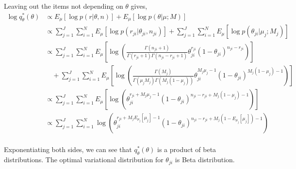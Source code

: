 \documentclass[11pt,reqno]{amsart}
\begin{document}
Leaving out the items not depending on $\theta$ gives,
\begin{equation}
\begin{split}
\log q_\theta^*(\theta) &\propto E_\mu \left[ \log p\left(r | \theta, n \right)\right] + E_\mu \left[ \log p\left(\theta | \mu; M \right)\right] \\
&\propto \sum_{j=1}^{J} \sum_{i=1}^{N} E_\mu  \left[ \log p \left( r_{ji} | \theta_{ji}, n_{ji} \right) \right] + \sum_{j=1}^{J} \sum_{i=1}^{N} E_\mu \left[ \log p\left(\theta_{ji} | \mu_j; M_j \right)\right] \\
&\propto \sum_{j=1}^{J} \sum_{i=1}^{N}  E_\mu  \left[ \log \left( \frac{ \Gamma(n_{ji}+1) } { \Gamma(r_{ji}+1) \Gamma( n_{ji} - r_{ji} + 1 ) } \theta_{ji}^{r_{ji}} (1 - \theta_{ji})^{n_{ji} - r_{ji}} \right) \right] \\
&\quad + \sum_{j=1}^{J} \sum_{i=1}^{N}  E_\mu  \left[ \log \left( \frac{ \Gamma(M_j) } { \Gamma(\mu_j M_j) \Gamma(M_j (1-\mu_j)) } \theta_{ji}^{M_j\mu_j -1} (1 - \theta_{ji})^{M_j ( 1 - \mu_j) - 1} \right) \right] \\
&\propto \sum_{j=1}^{J} \sum_{i=1}^{N} E_\mu\left[ \log \left( \theta_{ji}^{r_{ji} + M_j\mu_j -1} (1 - \theta_{ji})^{n_{ji} - r_{ji} + M_j ( 1 - \mu_j) - 1} \right) \right] \\
&\propto  \sum_{j=1}^{J} \sum_{i=1}^{N} \log \left( \theta_{ji}^{r_{ji} + M_j E_{\mu_j}\left[ \mu_j\right] -1} (1 - \theta_{ji})^{n_{ji} - r_{ji} + M_j ( 1 - E_{\mu_j}\left[ \mu_j\right]) - 1} \right) \\
\end{split}
\end{equation}

Exponentiating both sides, we can see that  $ q_\theta^*(\theta) $ is a product of beta distributions. The optimal variational distribution for $ \theta_{ji} $ is Beta distribution.
\iffalse
\begin{align}
\theta_{ji} \thicksim \text{Binomial}(\alpha_{ji}, \beta_{ji})
\end{align}
where,
\begin{align}
\alpha_{ji} &= r_{ji} + M_j E_\mu\left[ \mu_j\right] -1 \nonumber \\
\beta_{ji} &= n_{ji} - r_{ji} + M_j ( 1 - E_\mu\left[ \mu_j\right]) \nonumber
\end{align}
\fi

 
\end{document}
